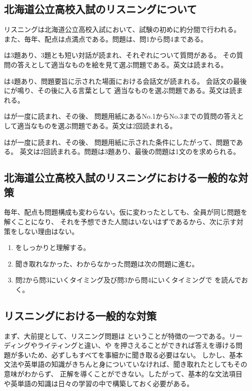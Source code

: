 \subsection{北海道公立高校入試のリスニングについて}
    リスニングは北海道公立高校入試において、試験の初めに約分間で行われる。
    また、毎年、配点は点満点である。問題は、問1から問4まである。

    は3題あり、3題とも短い対話が読まれ、それぞれについて質問がある。
    その質問の答えとして適当なものを絵を見て選ぶ問題である。英文は読まれる。

    は4題あり、問題要旨に示された場面における会話文が読まれる。
    会話文の最後にが鳴り、その後に入る言葉として
    適当なものを選ぶ問題である。英文は読まれる。

    はが一度に読まれ、その後、
    問題用紙にあるNo.1からNo.3までの質問の答えとして適当なものを選ぶ問題である。英文は2回読まれる。

    はが一度に読まれ、その後、
    問題用紙に示された条件にしたがって、問題である。
    英文は2回読まれる。問題は3題あり、最後の問題は1文のを求められる。

\subsection{北海道公立高校入試のリスニングにおける一般的な対策}
    毎年、配点も問題構成も変わらない。仮に変わったとしても、全員が同じ問題を解くことになり、
    それを予想できた人間はいないはずであるから、次に示す対策をしない理由はない。

    \begin{enumerate}
        \item {}をしっかりと理解する。
        \item 聞き取れなかった、わからなかった問題は次の問題に進む。
        \item 問2から問3にいくタイミング及び問3から問4にいくタイミングで
        を読んでおく。
    \end{enumerate}

\subsection{リスニングにおける一般的な対策}
    まず、大前提として、リスニング問題は
    ということが特徴の一つである。リーディングやライティングと違い、や
    を押さえることができれば答えを導ける問題が多いため、必ずしもすべてを事細かに聞き取る必要はない。
    しかし、基本文法や英単語の知識がきちんと身についていなければ、聞き取れたとしてもその意味がわからず、
    正解を導くことができない。したがって、基本的な文法項目や英単語の知識は日々の学習の中で構築しておく必要がある。

